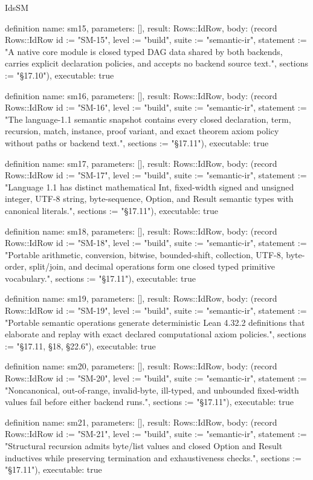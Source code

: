 \begin{lexlean}{IdsSM}
\begin{semanticmodule}
definition{
  name: sm15,
  parameters: [],
  result: Rows::IdRow,
  body: (record Rows::IdRow {id := "SM-15", level := "build", suite := "semantic-ir", statement := "A native core module is closed typed DAG data shared by both backends, carries explicit declaration policies, and accepts no backend source text.", sections := "§17.10"}),
  executable: true
}

definition{
  name: sm16,
  parameters: [],
  result: Rows::IdRow,
  body: (record Rows::IdRow {id := "SM-16", level := "build", suite := "semantic-ir", statement := "The language-1.1 semantic snapshot contains every closed declaration, term, recursion, match, instance, proof variant, and exact theorem axiom policy without paths or backend text.", sections := "§17.11"}),
  executable: true
}

definition{
  name: sm17,
  parameters: [],
  result: Rows::IdRow,
  body: (record Rows::IdRow {id := "SM-17", level := "build", suite := "semantic-ir", statement := "Language 1.1 has distinct mathematical Int, fixed-width signed and unsigned integer, UTF-8 string, byte-sequence, Option, and Result semantic types with canonical literals.", sections := "§17.11"}),
  executable: true
}

definition{
  name: sm18,
  parameters: [],
  result: Rows::IdRow,
  body: (record Rows::IdRow {id := "SM-18", level := "build", suite := "semantic-ir", statement := "Portable arithmetic, conversion, bitwise, bounded-shift, collection, UTF-8, byte-order, split/join, and decimal operations form one closed typed primitive vocabulary.", sections := "§17.11"}),
  executable: true
}

definition{
  name: sm19,
  parameters: [],
  result: Rows::IdRow,
  body: (record Rows::IdRow {id := "SM-19", level := "build", suite := "semantic-ir", statement := "Portable semantic operations generate deterministic Lean 4.32.2 definitions that elaborate and replay with exact declared computational axiom policies.", sections := "§17.11, §18, §22.6"}),
  executable: true
}

definition{
  name: sm20,
  parameters: [],
  result: Rows::IdRow,
  body: (record Rows::IdRow {id := "SM-20", level := "build", suite := "semantic-ir", statement := "Noncanonical, out-of-range, invalid-byte, ill-typed, and unbounded fixed-width values fail before either backend runs.", sections := "§17.11"}),
  executable: true
}

definition{
  name: sm21,
  parameters: [],
  result: Rows::IdRow,
  body: (record Rows::IdRow {id := "SM-21", level := "build", suite := "semantic-ir", statement := "Structural recursion admits byte/list values and closed Option and Result inductives while preserving termination and exhaustiveness checks.", sections := "§17.11"}),
  executable: true
}


\end{semanticmodule}
\end{lexlean}
